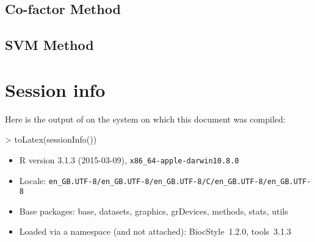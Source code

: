 \documentclass{article}
\begin{document}
\subsection{Co-factor Method}
\subsection{SVM Method}


\section{Session info}

Here is the output of  on the system on which
this document was compiled:
\begin{Schunk}
\begin{Sinput}
> toLatex(sessionInfo())
\end{Sinput}
\begin{itemize}\raggedright
  \item R version 3.1.3 (2015-03-09), \verb|x86_64-apple-darwin10.8.0|
  \item Locale: \verb|en_GB.UTF-8/en_GB.UTF-8/en_GB.UTF-8/C/en_GB.UTF-8/en_GB.UTF-8|
  \item Base packages: base, datasets, graphics, grDevices, methods, stats,
    utils
  \item Loaded via a namespace (and not attached): BiocStyle~1.2.0, tools~3.1.3
\end{itemize}\end{Schunk}


\end{document}

